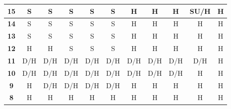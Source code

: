\documentclass[conference]{IEEEtran}
\begin{document}
\begin{table}[htbp]
\begin{tabular}{|c|c|c|c|c|c|c|c|c|c|c|}
\textbf{15} & \cellcolor[HTML]{32CB00}S & \cellcolor[HTML]{32CB00}S & \cellcolor[HTML]{32CB00}S & \cellcolor[HTML]{32CB00}S & \cellcolor[HTML]{32CB00}S & \cellcolor[HTML]{FE0000}H & \cellcolor[HTML]{FE0000}H & \cellcolor[HTML]{FE0000}H & \cellcolor[HTML]{34CDF9}SU/H & \cellcolor[HTML]{FE0000}H \\ \hline
\textbf{14} & \cellcolor[HTML]{32CB00}S & \cellcolor[HTML]{32CB00}S & \cellcolor[HTML]{32CB00}S & \cellcolor[HTML]{32CB00}S & \cellcolor[HTML]{32CB00}S & \cellcolor[HTML]{FE0000}H & \cellcolor[HTML]{FE0000}H & \cellcolor[HTML]{FE0000}H & \cellcolor[HTML]{FE0000}H & \cellcolor[HTML]{FE0000}H \\ \hline
\textbf{13} & \cellcolor[HTML]{32CB00}S & \cellcolor[HTML]{32CB00}S & \cellcolor[HTML]{32CB00}S & \cellcolor[HTML]{32CB00}S & \cellcolor[HTML]{32CB00}S & \cellcolor[HTML]{FE0000}H & \cellcolor[HTML]{FE0000}H & \cellcolor[HTML]{FE0000}H & \cellcolor[HTML]{FE0000}H & \cellcolor[HTML]{FE0000}H \\ \hline
\textbf{12} & \cellcolor[HTML]{FE0000}H & \cellcolor[HTML]{FE0000}H & \cellcolor[HTML]{32CB00}S & \cellcolor[HTML]{32CB00}S & \cellcolor[HTML]{32CB00}S & \cellcolor[HTML]{FE0000}H & \cellcolor[HTML]{FE0000}H & \cellcolor[HTML]{FE0000}H & \cellcolor[HTML]{FE0000}H & \cellcolor[HTML]{FE0000}H \\ \hline
\textbf{11} & \cellcolor[HTML]{FFC702}D/H & \cellcolor[HTML]{FFC702}D/H & \cellcolor[HTML]{FFC702}D/H & \cellcolor[HTML]{FFC702}D/H & \cellcolor[HTML]{FFC702}D/H & \cellcolor[HTML]{FFC702}D/H & \cellcolor[HTML]{FFC702}D/H & \cellcolor[HTML]{FFC702}D/H & \cellcolor[HTML]{FFC702}D/H & \cellcolor[HTML]{FE0000}H \\ \hline
\textbf{10} & \cellcolor[HTML]{FFC702}D/H & \cellcolor[HTML]{FFC702}D/H & \cellcolor[HTML]{FFC702}D/H & \cellcolor[HTML]{FFC702}D/H & \cellcolor[HTML]{FFC702}D/H & \cellcolor[HTML]{FFC702}D/H & \cellcolor[HTML]{FFC702}D/H & \cellcolor[HTML]{FFC702}D/H & \cellcolor[HTML]{FE0000}H & \cellcolor[HTML]{FE0000}H \\ \hline
\textbf{9} & \cellcolor[HTML]{FE0000}H & \cellcolor[HTML]{FFC702}D/H & \cellcolor[HTML]{FFC702}D/H & \cellcolor[HTML]{FFC702}D/H & \cellcolor[HTML]{FFC702}D/H & \cellcolor[HTML]{FE0000}H & \cellcolor[HTML]{FE0000}H & \cellcolor[HTML]{FE0000}H & \cellcolor[HTML]{FE0000}H & \cellcolor[HTML]{FE0000}H \\ \hline
\textbf{8} & \cellcolor[HTML]{FE0000}H & \cellcolor[HTML]{FE0000}H & \cellcolor[HTML]{FE0000}H & \cellcolor[HTML]{FE0000}H & \cellcolor[HTML]{FE0000}H & \cellcolor[HTML]{FE0000}H & \cellcolor[HTML]{FE0000}H & \cellcolor[HTML]{FE0000}H & \cellcolor[HTML]{FE0000}H & \cellcolor[HTML]{FE0000}H \\ \hline

\end{tabular}
\end{table}
\end{document}
